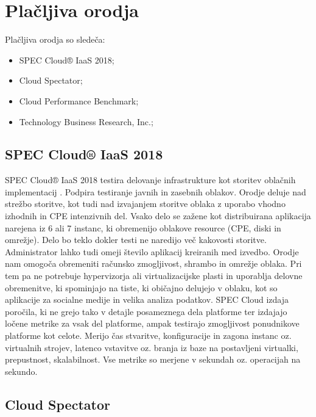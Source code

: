 \section{Plačljiva orodja}
Plačljiva orodja so sledeča:
\begin{itemize}
\item SPEC Cloud® IaaS 2018;
\item Cloud Spectator;
\item Cloud Performance Benchmark;
\item Technology Business Research, Inc.;
\end{itemize}

\subsection{SPEC Cloud® IaaS 2018}

SPEC Cloud® IaaS 2018 testira delovanje infrastrukture kot storitev oblačnih implementacij \cite{SPEC}. Podpira testiranje javnih in zasebnih oblakov. Orodje deluje nad strežbo storitve, kot tudi nad izvajanjem storitve oblaka z uporabo vhodno izhodnih in CPE intenzivnih del. Vsako delo se zažene kot distribuirana aplikacija narejena iz 6 ali 7 instanc, ki obremenijo oblakove resource (CPE, diski in omrežje). Delo bo teklo dokler testi ne naredijo več kakovosti storitve. Administrator lahko tudi omeji število aplikacij kreiranih med izvedbo.
Orodje nam omogoča obremeniti računsko zmogljivost, shrambo in omrežje oblaka. Pri tem pa ne potrebuje hypervizorja ali virtualizacijske plasti in uporablja delovne obremenitve, ki spominjajo na tiste, ki običajno delujejo v oblaku, kot so aplikacije za socialne medije in velika analiza podatkov.
SPEC Cloud izdaja poročila, ki ne grejo tako v detajle posameznega dela platforme ter izdajajo ločene metrike za vsak del platforme, ampak testirajo zmogljivost ponudnikove platforme kot celote. Merijo čas stvaritve, konfiguracije in zagona instanc oz. virtualnih strojev, latenco vstavitve oz. branja iz baze na postavljeni virtualki, prepustnost, skalabilnost. Vse metrike so merjene v sekundah oz. operacijah na sekundo.

\subsection{Cloud Spectator}

